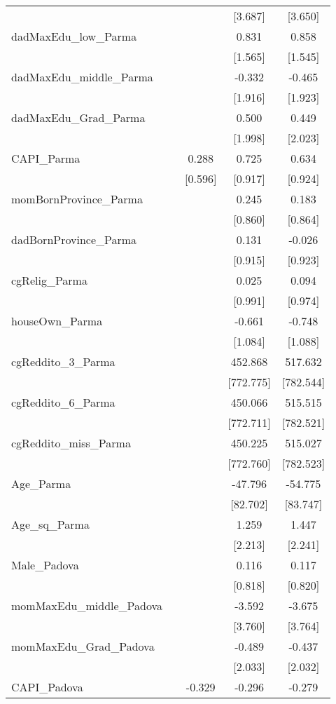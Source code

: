 \documentclass[]{article}
\begin{document}
\begin{tabular}{lcccc}
 &  &  & [3.687] & [3.650] \\
dadMaxEdu\_low\_Parma &  &  & 0.831 & 0.858 \\
 &  &  & [1.565] & [1.545] \\
dadMaxEdu\_middle\_Parma &  &  & -0.332 & -0.465 \\
 &  &  & [1.916] & [1.923] \\
dadMaxEdu\_Grad\_Parma &  &  & 0.500 & 0.449 \\
 &  &  & [1.998] & [2.023] \\
CAPI\_Parma &  & 0.288 & 0.725 & 0.634 \\
 &  & [0.596] & [0.917] & [0.924] \\
momBornProvince\_Parma &  &  & 0.245 & 0.183 \\
 &  &  & [0.860] & [0.864] \\
dadBornProvince\_Parma &  &  & 0.131 & -0.026 \\
 &  &  & [0.915] & [0.923] \\
cgRelig\_Parma &  &  & 0.025 & 0.094 \\
 &  &  & [0.991] & [0.974] \\
houseOwn\_Parma &  &  & -0.661 & -0.748 \\
 &  &  & [1.084] & [1.088] \\
cgReddito\_3\_Parma &  &  & 452.868 & 517.632 \\
 &  &  & [772.775] & [782.544] \\
cgReddito\_6\_Parma &  &  & 450.066 & 515.515 \\
 &  &  & [772.711] & [782.521] \\
cgReddito\_miss\_Parma &  &  & 450.225 & 515.027 \\
 &  &  & [772.760] & [782.523] \\
Age\_Parma &  &  & -47.796 & -54.775 \\
 &  &  & [82.702] & [83.747] \\
Age\_sq\_Parma &  &  & 1.259 & 1.447 \\
 &  &  & [2.213] & [2.241] \\
Male\_Padova &  &  & 0.116 & 0.117 \\
 &  &  & [0.818] & [0.820] \\
momMaxEdu\_middle\_Padova &  &  & -3.592 & -3.675 \\
 &  &  & [3.760] & [3.764] \\
momMaxEdu\_Grad\_Padova &  &  & -0.489 & -0.437 \\
 &  &  & [2.033] & [2.032] \\
CAPI\_Padova &  & -0.329 & -0.296 & -0.279 \\

\end{tabular}
\end{document}
